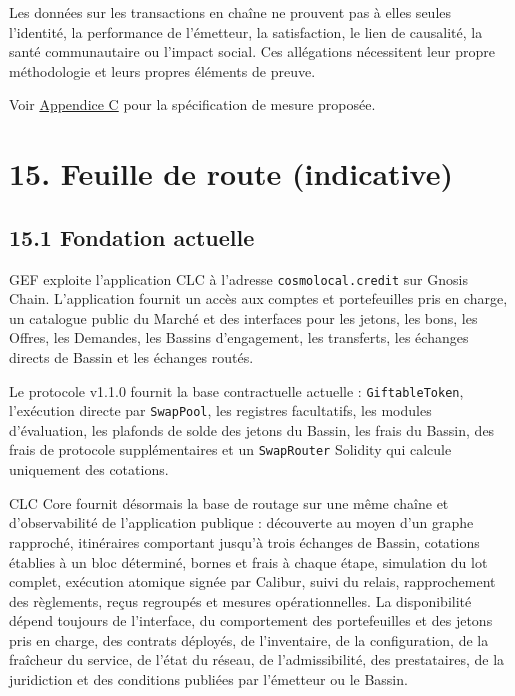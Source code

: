\documentclass[11pt]{article}
\begin{document}
Les données sur les transactions en chaîne ne prouvent pas à elles seules l'identité, la performance de l'émetteur, la satisfaction, le lien de causalité, la santé communautaire ou l'impact social. Ces allégations nécessitent leur propre méthodologie et leurs propres éléments de preuve.

Voir \href{https://docs.cosmolocal.credit/fr/white-paper/appendix-c-kpi-definitions}{Appendice C} pour la spécification de mesure proposée.


\section*{15. Feuille de route (indicative)}

\subsection*{15.1 Fondation actuelle}

GEF exploite l'application CLC à l'adresse \texttt{cosmolocal.credit} sur Gnosis Chain. L'application fournit un accès aux comptes et portefeuilles pris en charge, un catalogue public du Marché et des interfaces pour les jetons, les bons, les Offres, les Demandes, les Bassins d'engagement, les transferts, les échanges directs de Bassin et les échanges routés.

Le protocole v1.1.0 fournit la base contractuelle actuelle : \texttt{GiftableToken}, l'exécution directe par \texttt{SwapPool}, les registres facultatifs, les modules d'évaluation, les plafonds de solde des jetons du Bassin, les frais du Bassin, des frais de protocole supplémentaires et un \texttt{SwapRouter} Solidity qui calcule uniquement des cotations.

CLC Core fournit désormais la base de routage sur une même chaîne et d'observabilité de l'application publique : découverte au moyen d'un graphe rapproché, itinéraires comportant jusqu'à trois échanges de Bassin, cotations établies à un bloc déterminé, bornes et frais à chaque étape, simulation du lot complet, exécution atomique signée par Calibur, suivi du relais, rapprochement des règlements, reçus regroupés et mesures opérationnelles. La disponibilité dépend toujours de l'interface, du comportement des portefeuilles et des jetons pris en charge, des contrats déployés, de l'inventaire, de la configuration, de la fraîcheur du service, de l'état du réseau, de l'admissibilité, des prestataires, de la juridiction et des conditions publiées par l'émetteur ou le Bassin.
\end{document}
